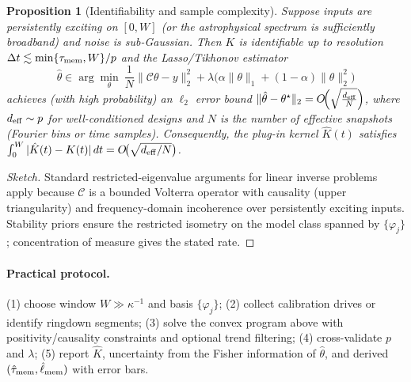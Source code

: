 \documentclass[a4paper,11pt]{article}
\theoremstyle{plain}
\newtheorem{proposition}{Proposition}
\theoremstyle{definition}
\theoremstyle{remark}
\begin{document}
\begin{proposition}[Identifiability and sample complexity]\label{prop:identifiability}
Suppose inputs are persistently exciting on $[0,W]$ (or the astrophysical spectrum is sufficiently broadband) and noise is sub-Gaussian.
Then $K$ is identifiable up to resolution $\Delta t\lesssim \min\{\tau_{\rm mem},W\}/p$ and the Lasso/Tikhonov estimator
\begin{equation}
\hat\theta \in \arg\min_{\theta}\ \frac{1}{N}\|\mathcal{C}\theta-y\|_2^2+\lambda\big(\alpha\|\theta\|_1+(1-\alpha)\|\theta\|_2^2\big)
\end{equation}
achieves (with high probability) an $\ell_2$ error bound $\|\hat\theta-\theta^\star\|_2 = O\!\Big(\sqrt{\tfrac{d_{\rm eff}}{N}}\Big)$,
where $d_{\rm eff}\sim p$ for well-conditioned designs and $N$ is the number of effective snapshots (Fourier bins or time samples).
Consequently, the plug-in kernel $\hat K(t)$ satisfies $\int_0^W|\hat K(t)-K(t)|\,dt=O\!\big(\sqrt{d_{\rm eff}/N}\big)$.
\end{proposition}
\begin{proof}[Sketch]
Standard restricted-eigenvalue arguments for linear inverse problems apply because $\mathcal{C}$ is a bounded Volterra operator with
causality (upper triangularity) and frequency-domain incoherence over persistently exciting inputs. Stability priors ensure the
restricted isometry on the model class spanned by $\{\varphi_j\}$; concentration of measure gives the stated rate.
\end{proof}

\paragraph{Practical protocol.} (1) choose window $W\gg \kappa^{-1}$ and basis $\{\varphi_j\}$; (2) collect calibration drives or
identify ringdown segments; (3) solve the convex program above with positivity/causality constraints and optional trend filtering;
(4) cross-validate $p$ and $\lambda$; (5) report $\hat K$, uncertainty from the Fisher information of $\hat\theta$, and derived
$(\hat\tau_{\rm mem},\hat\ell_{\rm mem})$ with error bars.
\end{document}
